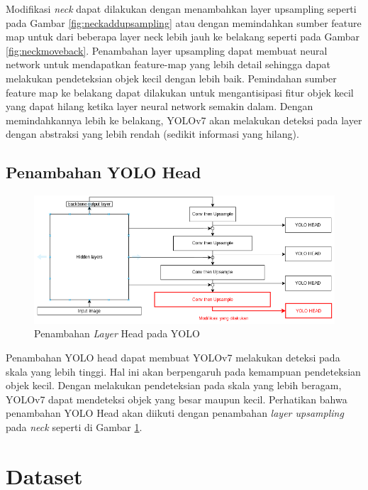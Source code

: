     Modifikasi \emph{neck} dapat dilakukan dengan menambahkan layer upsampling seperti pada Gambar \ref{fig:neckaddupsampling} atau dengan memindahkan sumber feature map untuk dari beberapa layer neck lebih jauh ke belakang seperti pada Gambar \ref{fig:neckmoveback}.
    Penambahan layer upsampling dapat membuat neural network untuk mendapatkan feature-map yang lebih detail sehingga dapat melakukan pendeteksian objek kecil dengan lebih baik.
    Pemindahan sumber feature map ke belakang dapat dilakukan untuk mengantisipasi fitur objek kecil yang dapat hilang ketika layer neural network semakin dalam.
    Dengan memindahkannya lebih ke belakang, YOLOv7 akan melakukan deteksi pada layer dengan abstraksi yang lebih rendah (sedikit informasi yang hilang).
  \subsection{Penambahan YOLO Head}
    \begin{figure}[ht]
      \centering
      \includegraphics[scale=0.65]{pictures/addmorehead.png}
      \caption{Penambahan \emph{Layer} Head pada YOLO}
      \label{fig:addmorehead}
    \end{figure}
    Penambahan YOLO head dapat membuat YOLOv7 melakukan deteksi pada skala yang lebih tinggi.
    Hal ini akan berpengaruh pada kemampuan pendeteksian objek kecil.
    Dengan melakukan pendeteksian pada skala yang lebih beragam, YOLOv7 dapat mendeteksi objek yang besar maupun kecil.
    Perhatikan bahwa penambahan YOLO Head akan diikuti dengan penambahan \emph{layer upsampling} pada \emph{neck} seperti di Gambar \ref{fig:addmorehead}.
    
\section{Dataset}
